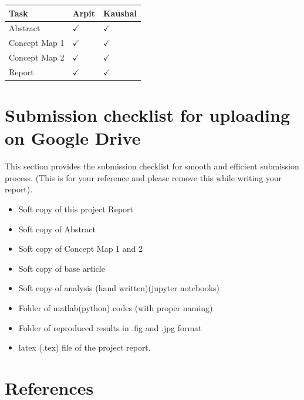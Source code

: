 \documentclass[11pt]{article}
\providecommand{\tightlist}{%
      \setlength{\itemsep}{0pt}\setlength{\parskip}{0pt}}
\begin{document}
\begin{longtable}[]{@{}lll@{}}
\toprule
Task & Arpit & Kaushal\tabularnewline
\midrule
\endhead
Abstract & \(\checkmark\) & \(\checkmark\)\tabularnewline
Concept Map 1 & \(\checkmark\) & \(\checkmark\)\tabularnewline
Concept Map 2 & \(\checkmark\) & \(\checkmark\)\tabularnewline
Report & \(\checkmark\) & \(\checkmark\)\tabularnewline
\bottomrule
\end{longtable}

\hypertarget{submission-checklist-for-uploading-on-google-drive}{%
\section{Submission checklist for uploading on Google
Drive}\label{submission-checklist-for-uploading-on-google-drive}}

This section provides the submission checklist for smooth and efficient
submission process. (This is for your reference and please remove this
while writing your report).

\begin{itemize}
\tightlist
\item
  Soft copy of this project Report
\item
  Soft copy of Abstract
\item
  Soft copy of Concept Map 1 and 2
\item
  Soft copy of base article
\item
  Soft copy of analysis (hand written)(jupyter notebooks)
\item
  Folder of matlab(python) codes (with proper naming)
\item
  Folder of reproduced results in .fig and .jpg format
\item
  latex (.tex) file of the project report.
\end{itemize}

\hypertarget{references}{%
\section{References}\label{references}}
\end{document}
